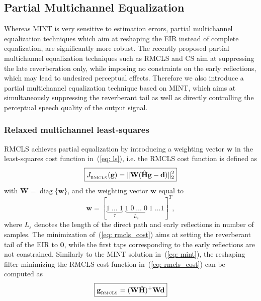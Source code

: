 \documentclass[10pt]{IEEEtran}
\DeclareMathOperator{\diag}{diag}
\begin{document}
\subsection{Partial Multichannel Equalization}
\label{sec: partial}
Whereas MINT is very sensitive to estimation errors, partial multichannel equalization techniques which aim at reshaping the EIR instead of complete equalization, are significantly more robust.
The recently proposed partial multichannel equalization techniques such as RMCLS and CS aim at suppressing the late reverberation only, while imposing no constraints on the early reflections, which may lead to undesired perceptual effects.
Therefore we also introduce a partial multichannel equalization technique based on MINT, which aims at simultaneously suppressing the reverberant tail as well as directly controlling the perceptual speech quality of the output signal.

\subsubsection*{Relaxed multichannel least-squares~\cite{Zhang_IWAENC_2010}}
RMCLS achieves partial equalization by introducing a weighting vector $\mathbf{w}$ in the least-squares cost function in~(\ref{eq: ls}), i.e. the RMCLS cost function is defined as
\begin{equation}
\label{eq: rmcls_cost}
\boxed{J_{_{\rm RMCLS}}(\mathbf{g}) = \|\mathbf{W}(\hat{\mathbf{H}}\mathbf{g} - \mathbf{d})\|_2^2}
\end{equation}
with $\mathbf{W} = {\diag}\{\mathbf{w}\}$, and the weighting vector $\mathbf{w}$ equal to
\begin{equation}
\mathbf{w} = [\underbrace{1 \; \ldots \; 1}_{\tau} \; \underbrace{1 \; 0 \; \ldots \; 0}_{L_s} \; 1 \; \ldots 1]^{T},
\end{equation}
where $L_s$ denotes the length of the direct path and early reflections in number of samples.
The minimization of~(\ref{eq: rmcls_cost}) aims at setting the reverberant tail of the EIR to $\mathbf{0}$, while the first taps corresponding to the early reflections are not constrained.
Similarly to the MINT solution in~(\ref{eq: mint}), the reshaping filter minimizing the RMCLS cost function in~(\ref{eq: rmcls_cost}) can be computed as
\begin{equation}
\boxed{\mathbf{g}_{{}_{\rm RMCLS}} = (\mathbf{W}\hat{\mathbf{H}})^{+}\mathbf{W}\mathbf{d}}
\end{equation}
\end{document}
